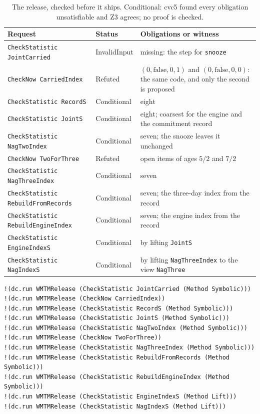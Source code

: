 \documentclass[11pt]{article}
\newcommand{\code}[1]{\texttt{#1}}
\theoremstyle{definition}
\theoremstyle{plain}
\begin{document}
\begin{table}[ht]
\centering\small
\begin{tabularx}{\textwidth}{>{\raggedright\arraybackslash}p{6.1cm}>{\raggedright\arraybackslash}p{2.1cm}>{\raggedright\arraybackslash}X}
\toprule
Request & Status & Obligations or witness\\
\midrule
\code{CheckStatistic JointCarried} & InvalidInput & missing: the step for \code{snooze}\\
\code{CheckNow CarriedIndex} & Refuted & $(0,\mathrm{false},0,1)$ and $(0,\mathrm{false},0,0)$: the
same code, and only the second is proposed\\
\code{CheckStatistic RecordS} & Conditional & eight\\
\code{CheckStatistic JointS} & Conditional & eight; coarsest for the engine and the commitment
record\\
\code{CheckStatistic NagTwoIndex} & Conditional & seven; the snooze leaves it unchanged\\
\code{CheckNow TwoForThree} & Refuted & open items of ages $5/2$ and $7/2$\\
\code{CheckStatistic NagThreeIndex} & Conditional & seven\\
\code{CheckStatistic RebuildFromRecords} & Conditional & seven; the three-day index from the record\\
\code{CheckStatistic RebuildEngineIndex} & Conditional & seven; the engine index from the record\\
\code{CheckStatistic EngineIndexS} & Conditional & by lifting \code{JointS}\\
\code{CheckStatistic NagIndexS} & Conditional & by lifting \code{NagThreeIndex} to the view
\code{NagThree}\\
\bottomrule
\end{tabularx}
\caption{The release, checked before it ships. Conditional: cvc5 found every obligation
unsatisfiable and Z3 agrees; no proof is checked.}\label{tab:release}
\end{table}

\begin{lstlisting}[style=mettamod]
!(dc.run WMTMRelease (CheckStatistic JointCarried (Method Symbolic)))
!(dc.run WMTMRelease (CheckNow CarriedIndex))
!(dc.run WMTMRelease (CheckStatistic RecordS (Method Symbolic)))
!(dc.run WMTMRelease (CheckStatistic JointS (Method Symbolic)))
!(dc.run WMTMRelease (CheckStatistic NagTwoIndex (Method Symbolic)))
!(dc.run WMTMRelease (CheckNow TwoForThree))
!(dc.run WMTMRelease (CheckStatistic NagThreeIndex (Method Symbolic)))
!(dc.run WMTMRelease (CheckStatistic RebuildFromRecords (Method Symbolic)))
!(dc.run WMTMRelease (CheckStatistic RebuildEngineIndex (Method Symbolic)))
!(dc.run WMTMRelease (CheckStatistic EngineIndexS (Method Lift)))
!(dc.run WMTMRelease (CheckStatistic NagIndexS (Method Lift)))
\end{lstlisting}
\end{document}
